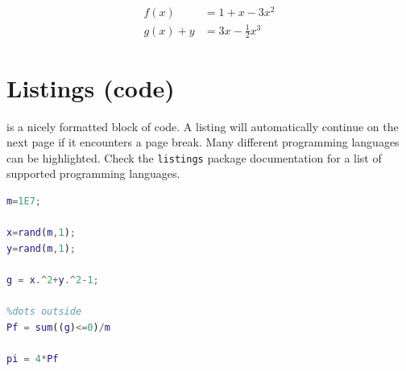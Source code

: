 \begin{align} 
    \label{eq:align1}     
    f(x) &= 1 + x - 3 x^2 \\
    \label{eq:align2} 
    g(x) + y &= 3x - \frac{1}{2} x^3 
\end{align}




\section{Listings (code)}

 is a nicely formatted block of code. A listing will automatically continue on the next page if it encounters a page break. Many different programming languages can be highlighted. Check the \texttt{listings} package documentation for a list of supported programming languages. 

\begin{lstlisting}[language=Matlab, caption = Monte Carlo simulation to estimate the value of $\pi$, label=lst:montecarlo]
%% Monte Carlo simulation, estimation of pi
m=1E7;

x=rand(m,1);
y=rand(m,1);

g = x.^2+y.^2-1;

%dots outside
Pf = sum((g)<=0)/m

pi = 4*Pf
\end{lstlisting}


